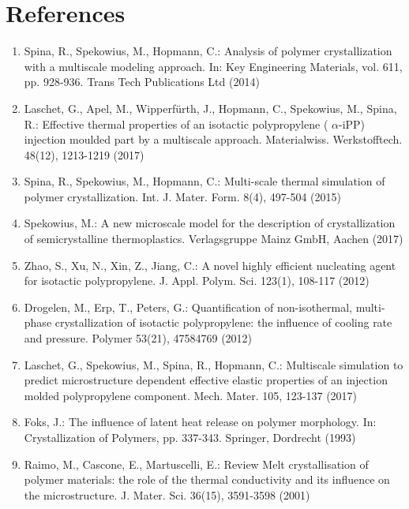 \documentclass[10pt]{article}
\begin{document}
\section*{References}
\begin{enumerate}
  \item Spina, R., Spekowius, M., Hopmann, C.: Analysis of polymer crystallization with a multiscale modeling approach. In: Key Engineering Materials, vol. 611, pp. 928-936. Trans Tech Publications Ltd (2014)

  \item Laschet, G., Apel, M., Wipperfürth, J., Hopmann, C., Spekowius, M., Spina, R.: Effective thermal properties of an isotactic polypropylene ( $\alpha$-iPP) injection moulded part by a multiscale approach. Materialwiss. Werkstofftech. 48(12), 1213-1219 (2017)

  \item Spina, R., Spekowius, M., Hopmann, C.: Multi-scale thermal simulation of polymer crystallization. Int. J. Mater. Form. 8(4), 497-504 (2015)

  \item Spekowius, M.: A new microscale model for the description of crystallization of semicrystalline thermoplastics. Verlagsgruppe Mainz GmbH, Aachen (2017)

  \item Zhao, S., Xu, N., Xin, Z., Jiang, C.: A novel highly efficient nucleating agent for isotactic polypropylene. J. Appl. Polym. Sci. 123(1), 108-117 (2012)

  \item Drogelen, M., Erp, T., Peters, G.: Quantification of non-isothermal, multi-phase crystallization of isotactic polypropylene: the influence of cooling rate and pressure. Polymer 53(21), 47584769 (2012)

  \item Laschet, G., Spekowius, M., Spina, R., Hopmann, C.: Multiscale simulation to predict microstructure dependent effective elastic properties of an injection molded polypropylene component. Mech. Mater. 105, 123-137 (2017)

  \item Foks, J.: The influence of latent heat release on polymer morphology. In: Crystallization of Polymers, pp. 337-343. Springer, Dordrecht (1993)

  \item Raimo, M., Cascone, E., Martuscelli, E.: Review Melt crystallisation of polymer materials: the role of the thermal conductivity and its influence on the microstructure. J. Mater. Sci. 36(15), 3591-3598 (2001)


\end{enumerate}
\end{document}
